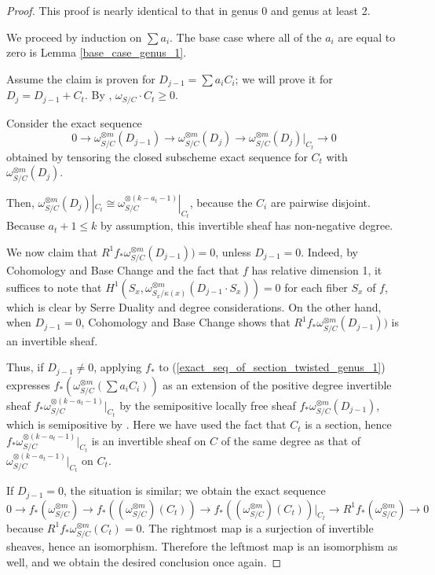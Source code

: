 \begin{proof}
This proof is nearly identical to that in genus 0 and genus at least 2.

We proceed by induction on $\sum a_i$.
The base case where all of the $a_i$ are equal to zero is Lemma \ref{base_case_genus_1}.

Assume the claim is proven for $D_{j-1}=\sum a_iC_i$; we will prove it for $D_{j}=D_{j-1}+C_t$.
By , $\omega_{S/C}\cdot C_t\ge0$.

Consider the exact sequence
\begin{equation}\label{exact_seq_of_section_twisted_genus_1}
0\to\omega_{S/C}^{\otimes m}(D_{j-1})\to\omega_{S/C}^{\otimes m}(D_j)\to \omega_{S/C}^{\otimes m}(D_j)|_{C_t}\to0
\end{equation}
obtained by tensoring the closed subscheme exact sequence for $C_t$ with $\omega_{S/C}^{\otimes m}(D_j)$.

Then, $\omega_{S/C}^{\otimes m}(D_j)|_{C_t}\cong \omega_{S/C}^{\otimes (k-a_{t}-1)}|_{C_t}$, because the $C_i$ are pairwise disjoint.
Because $a_{t}+1\le k$ by assumption, this invertible sheaf has non-negative degree.

We now claim that $R^{1}f_{*}\omega_{S/C}^{\otimes m}(D_{j-1}))=0$, unless $D_{j-1}=0$.
Indeed, by Cohomology and Base Change and the fact that $f$ has relative dimension 1, it suffices to note that $H^{1}(S_x,\omega_{S_x/\kappa(x)}^{\otimes m}(D_{j-1}\cdot S_x))=0$ for each fiber $S_x$ of $f$, which is clear by Serre Duality and degree considerations.
On the other hand, when $D_{j-1}=0$, Cohomology and Base Change shows that $R^{1}f_{*}\omega_{S/C}^{\otimes m}(D_{j-1}))$ is an invertible sheaf.


Thus, if $D_{j-1}\neq0$, applying $f_{*}$ to (\ref{exact_seq_of_section_twisted_genus_1}) expresses $f_{*}(\omega_{S/C}^{\otimes m}(\sum a_iC_i))$ as an extension of the positive degree invertible sheaf $f_{*}\omega_{S/C}^{\otimes (k-a_{t}-1)}|_{C_t}$ by the semipositive locally free sheaf $f_{*}\omega_{S/C}^{\otimes m}(D_{j-1})$, which is semipositive by .
Here we have used the fact that $C_t$ is a section, hence $f_{*}\omega_{S/C}^{\otimes (k-a_{t}-1)}|_{C_t}$ is an invertible sheaf on $C$ of the same degree as that of $\omega_{S/C}^{\otimes (k-a_{t}-1)}|_{C_t}$ on $C_t$.

If $D_{j-1}=0$, the situation is similar; we obtain the exact sequence
$$
0\to f_{*}(\omega_{S/C}^{\otimes m})\to f_{*}((\omega_{S/C}^{\otimes m})(C_t))\to f_{*}((\omega_{S/C}^{\otimes m})(C_t))|_{C_t}\to R^{1}f_{*}(\omega_{S/C}^{\otimes m})\to0
$$
because $R^{1}f_{*}\omega_{S/C}^{\otimes m}(C_t)=0$.
The rightmost map is a surjection of invertible sheaves, hence an isomorphism.
Therefore the leftmost map is an isomorphism as well, and we obtain the desired conclusion once again.
\end{proof}



